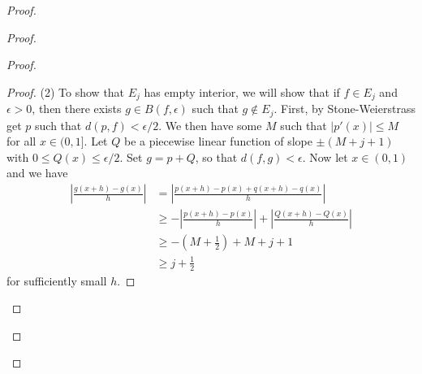 \documentclass[12pt, a4paper]{book}
\theoremstyle{nonumberplain}
\newtheorem{proof}{Proof}
\begin{document}
\begin{proof}
\begin{proof}
\begin{proof}
\begin{proof}
    (2) To show that $E_j$ has empty interior, we will show that if $f\in E_j$ and $\epsilon>0$, then there exists $g\in B(f,\epsilon)$ such that $g\notin E_j$.
    First, by Stone-Weierstrass get $p$ such that $d(p,f)<\epsilon/2$.
    We then have some $M$ such that $|p'(x)|\leq M$ for all $x\in(0,1]$.
    Let $Q$ be a piecewise linear function of slope $\pm(M+j+1)$ with $0\leq Q(x)\leq\epsilon/2$.
    Set $g=p+Q$, so that $d(f,g)<\epsilon$.
    Now let $x\in(0,1)$ and we have
    \begin{align*}
        \left\lvert\frac{g(x+h)-g(x)}{h}\right\rvert &= \left\lvert\frac{p(x+h)-p(x)+q(x+h)-q(x)}{h}\right\rvert\\
                                                     &\geq -\left\lvert\frac{p(x+h)-p(x)}{h}\right\rvert+\left\lvert\frac{Q(x+h)-Q(x)}{h}\right\rvert\\
                                                     &\geq -\left(M+\frac{1}{2}\right)+M+j+1\\
                                                     &\geq j+\frac{1}{2}
    \end{align*}
    for sufficiently small $h$.


\end{proof}
\end{proof}
\end{proof}
\end{proof}
\end{document}
